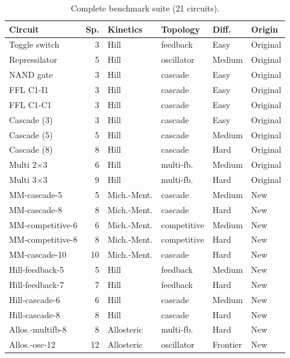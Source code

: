 \documentclass[11pt]{article}
\begin{document}
\begin{table}[t]
\centering
\caption{Complete benchmark suite (21 circuits).}
\label{tab:extended-benchmarks}
\small
\begin{tabular}{lrllll}
\toprule
\textbf{Circuit} & \textbf{Sp.} & \textbf{Kinetics} & \textbf{Topology} & \textbf{Diff.} & \textbf{Origin} \\
\midrule
Toggle switch     & 3 & Hill     & feedback    & Easy    & Original \\
Repressilator     & 5 & Hill     & oscillator  & Medium  & Original \\
NAND gate         & 3 & Hill     & cascade     & Easy    & Original \\
FFL C1-I1         & 3 & Hill     & cascade     & Easy    & Original \\
FFL C1-C1         & 3 & Hill     & cascade     & Easy    & Original \\
Cascade (3)       & 3 & Hill     & cascade     & Easy    & Original \\
Cascade (5)       & 5 & Hill     & cascade     & Medium  & Original \\
Cascade (8)       & 8 & Hill     & cascade     & Hard    & Original \\
Multi 2$\times$3  & 6 & Hill     & multi-fb.   & Medium  & Original \\
Multi 3$\times$3  & 9 & Hill     & multi-fb.   & Hard    & Original \\
\midrule
MM-cascade-5      & 5 & Mich.-Ment. & cascade     & Medium  & New \\
MM-cascade-8      & 8 & Mich.-Ment. & cascade     & Hard    & New \\
MM-competitive-6  & 6 & Mich.-Ment. & competitive & Medium  & New \\
MM-competitive-8  & 8 & Mich.-Ment. & competitive & Hard    & New \\
MM-cascade-10     & 10 & Mich.-Ment. & cascade    & Hard    & New \\
Hill-feedback-5   & 5 & Hill     & feedback    & Medium  & New \\
Hill-feedback-7   & 7 & Hill     & feedback    & Hard    & New \\
Hill-cascade-6    & 6 & Hill     & cascade     & Medium  & New \\
Hill-cascade-8    & 8 & Hill     & cascade     & Hard    & New \\
Allos.-multifb-8  & 8 & Allosteric & multi-fb. & Hard    & New \\
Allos.-osc-12     & 12 & Allosteric & oscillator & Frontier & New \\
\bottomrule
\end{tabular}
\end{table}
\end{document}
